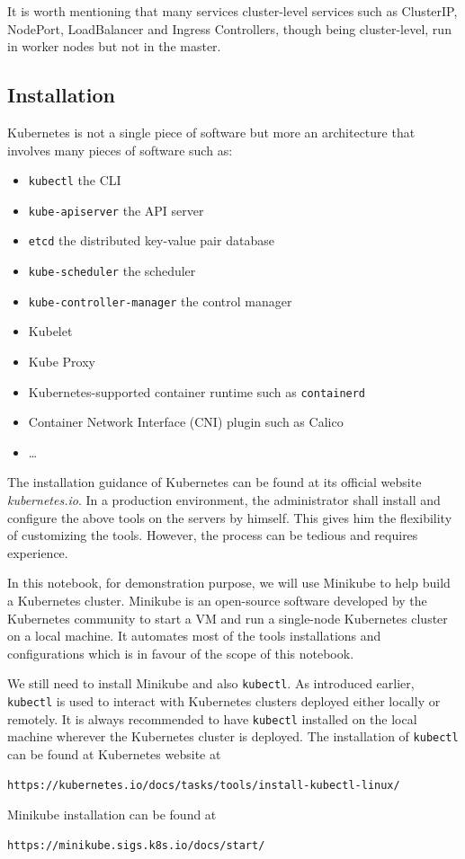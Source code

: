 It is worth mentioning that many services cluster-level services such as ClusterIP, NodePort, LoadBalancer and Ingress Controllers, though being cluster-level, run in worker nodes but not in the master. 

\subsection{Installation}

Kubernetes is not a single piece of software but more an architecture that involves many pieces of software such as:
\begin{itemize}
  \item \verb|kubectl| the CLI
  \item \verb|kube-apiserver| the API server
  \item \verb|etcd| the distributed key-value pair database
  \item \verb|kube-scheduler| the scheduler
  \item \verb|kube-controller-manager| the control manager
  \item Kubelet
  \item Kube Proxy
  \item Kubernetes-supported container runtime such as \verb|containerd|
  \item Container Network Interface (CNI) plugin such as Calico
  \item \ldots
\end{itemize}
The installation guidance of Kubernetes can be found at its official website \textit{kubernetes.io}. In a production environment, the administrator shall install and configure the above tools on the servers by himself. This gives him the flexibility of customizing the tools. However, the process can be tedious and requires experience.

In this notebook, for demonstration purpose, we will use Minikube to help build a Kubernetes cluster. Minikube is an open-source software developed by the Kubernetes community to start a VM and run a single-node Kubernetes cluster on a local machine. It automates most of the tools installations and configurations which is in favour of the scope of this notebook. 

We still need to install Minikube and also \verb|kubectl|. As introduced earlier, \verb|kubectl| is used to interact with Kubernetes clusters deployed either locally or remotely. It is always recommended to have \verb|kubectl| installed on the local machine wherever the Kubernetes cluster is deployed. The installation of \verb|kubectl| can be found at Kubernetes website at
\begin{lstlisting}
https://kubernetes.io/docs/tasks/tools/install-kubectl-linux/
\end{lstlisting}
Minikube installation can be found at
\begin{lstlisting}
https://minikube.sigs.k8s.io/docs/start/
\end{lstlisting}

